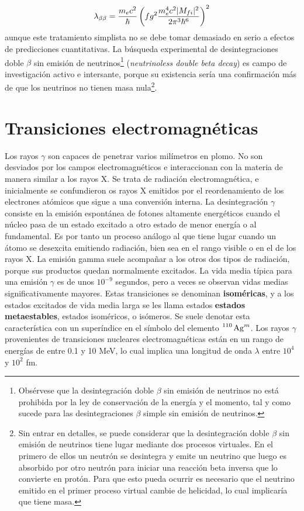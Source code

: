 \begin{equation}
	\lambda_{\beta \beta} = \frac{m_e c^2}{\hbar} \left( fg^2 \frac{m_e^4 c^2 |M_{fi}|^2}{2\pi^3 \hbar^6} \right)^2
\end{equation}
aunque este tratamiento simplista no se debe tomar demasiado en serio a efectos de predicciones cuantitativas. La búsqueda experimental de desintegraciones doble $\beta$ sin emisión de neutrinos\footnote{Obsérvese que la desintegración doble $\beta$ sin emisión de neutrinos no está prohibida por la ley de conservación de la energía y el momento, tal y como sucede para las desintegraciones $\beta$ simple sin emisión de neutrinos.} (\textit{neutrinoless double beta decay}) es campo de investigación activo e intersante, porque su existencia sería una confirmación más de que los neutrinos no tienen masa nula\footnote{Sin entrar en detalles, se puede considerar que la desintegración doble $\beta$ sin emisión de neutrinos tiene lugar mediante dos procesos virtuales. En el primero de ellos un neutrón se desintegra y emite un neutrino que luego es absorbido por otro neutrón para iniciar una reacción beta inversa que lo convierte en protón. Para que esto pueda ocurrir es necesario que el neutrino emitido en el primer proceso virtual cambie de helicidad, lo cual implicaría que tiene masa.}.


\section{Transiciones electromagnéticas}

Los rayos $\gamma$ son capaces de penetrar varios milímetros en plomo. No son desviados por los campos electromagnéticos e interaccionan con la materia de manera similar a los rayos X.  Se trata de radiación electromagnética, e inicialmente se confundieron os rayos X emitidos por el reordenamiento de los electrones atómicos que sigue a una conversión interna. La desintegración $\gamma$ consiste en la emisión espontánea de fotones altamente energéticos cuando el núcleo pasa de un estado excitado a otro estado de menor energía o al fundamental. Es por tanto un proceso análogo al que tiene lugar cuando un átomo se desexcita emitiendo radiación, bien sea en el rango visible o en el de los rayos X. La emisión gamma suele acompañar a los otros dos tipos de radiación, porque sus productos quedan normalmente excitados. La vida media típica para una emisión $\gamma$ es de unos $10^{-9}$ segundos, pero a veces se observan vidas medias significativamente mayores. Estas transiciones se denominan \textbf{isoméricas}, y a los estados excitados de vida media larga se les llama estados \textbf{estados metaestables}, estados isoméricos, o isómeros. Se suele denotar esta característica con un superíndice en el símbolo del elemento $\ce{^110 Ag^m}$. Los rayos $\gamma$ provenientes de transiciones nucleares electromagnéticas están en un rango de energías de entre 0.1 y 10 MeV, lo cual implica una longitud de onda $\lambda$ entre $10^4$ y $10^2$ fm. 

